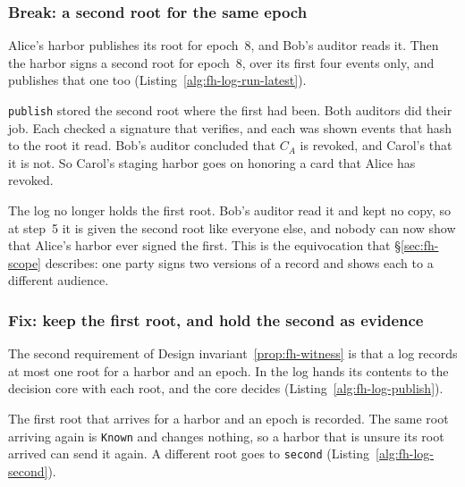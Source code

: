 
\subsubsection{Break: a second root for the same epoch}

Alice's harbor publishes its root for epoch~8, and Bob's auditor reads
it. Then the harbor signs a second root for epoch~8, over its first four
events only, and publishes that one too
(Listing~\ref{alg:fh-log-run-latest}).


\texttt{publish} stored the second root where the first had been. Both
auditors did their job. Each checked a signature that verifies, and each
was shown events that hash to the root it read. Bob's auditor concluded
that $C_A$ is revoked, and Carol's that it is not. So Carol's staging
harbor goes on honoring a card that Alice has revoked.

The log no longer holds the first root. Bob's auditor read it and kept no
copy, so at step~5 it is given the second root like everyone else, and
nobody can now show that Alice's harbor ever signed the first. This is the
equivocation that \S\ref{sec:fh-scope} describes: one party signs two
versions of a record and shows each to a different audience.

\subsubsection{Fix: keep the first root, and hold the second as evidence}

The second requirement of Design invariant~\ref{prop:fh-witness} is that a
log records at most one root for a harbor and an epoch. In
\pdkernelname{} the log hands its contents to the decision core with each
root, and the core decides (Listing~\ref{alg:fh-log-publish}).


The first root that arrives for a harbor and an epoch is recorded. The
same root arriving again is \texttt{Known} and changes nothing, so a
harbor that is unsure its root arrived can send it again. A different
root goes to \texttt{second} (Listing~\ref{alg:fh-log-second}).

